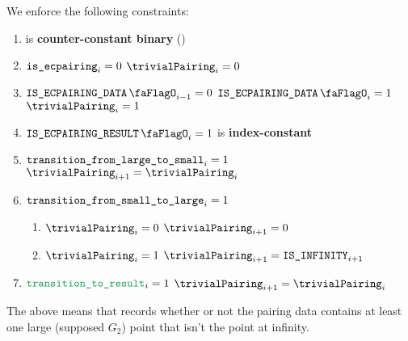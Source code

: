 We enforce the following constraints:
\begin{enumerate}
    \item \trivialPairing{} is \textbf{counter-constant binary} \quad (\trash)
    \item \If $\texttt{is\_ecpairing} _{i} = 0$ \Then $\trivialPairing _{i} = 0$
    \item \If $\isEcpairingData_{i - 1} = 0$ \et $\isEcpairingData _{i} = 1$ \Then $\trivialPairing_{i} = 1$
    \item \If $\isEcpairingResult_{i} = 1$ \Then \trivialPairing{} is \textbf{index-constant}
    \item \If $\texttt{transition\_from\_large\_to\_small}_{i} = 1$ \Then $\trivialPairing_{i+1} = \trivialPairing_{i}$
    \item \If $\texttt{transition\_from\_small\_to\_large}_{i} = 1$ \Then
          \begin{enumerate}
              \item \If $\trivialPairing _{i} = 0$ \Then $\trivialPairing _{i + 1} = 0$
              \item \If $\trivialPairing _{i} = 1$ \Then $\trivialPairing _{i + 1} = \isInfinity_{i + 1}$
          \end{enumerate}
    \item \If $\locTransitionToResult_{i} = 1$ \Then $\trivialPairing_{i+1} = \trivialPairing_{i}$
\end{enumerate}
\saNote{} The above means that \trivialPairing{} records whether or not the pairing data contains at least one large (supposed $G_2$) point that isn't the point at infinity.

